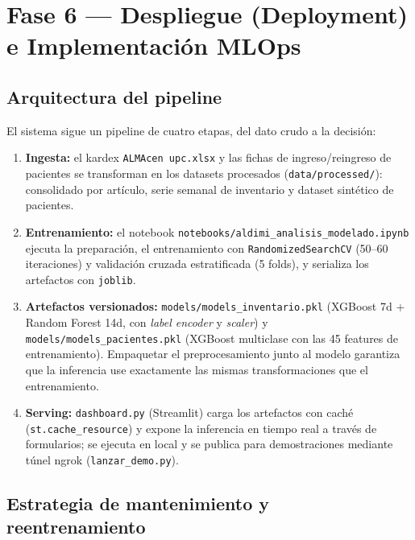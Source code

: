 \section{Fase 6 --- Despliegue (Deployment) e Implementación MLOps}

\subsection{Arquitectura del pipeline}

El sistema sigue un pipeline de cuatro etapas, del dato crudo a la decisión:

\begin{enumerate}[leftmargin=1.8em]
  \item \textbf{Ingesta:} el kardex \texttt{ALMAcen upc.xlsx} y las fichas
        de ingreso/reingreso de pacientes se transforman en los datasets
        procesados (\texttt{data/processed/}): consolidado por artículo,
        serie semanal de inventario y dataset sintético de pacientes.
  \item \textbf{Entrenamiento:} el notebook
        \texttt{notebooks/aldimi\_analisis\_modelado.ipynb} ejecuta la
        preparación, el entrenamiento con \texttt{RandomizedSearchCV}
        (50--60 iteraciones) y validación cruzada estratificada (5 folds),
        y serializa los artefactos con \texttt{joblib}.
  \item \textbf{Artefactos versionados:} \texttt{models/models\_inventario.pkl}
        (XGBoost 7d + Random Forest 14d, con \emph{label encoder} y
        \emph{scaler}) y \texttt{models/models\_pacientes.pkl} (XGBoost
        multiclase con las 45 features de entrenamiento). Empaquetar el
        preprocesamiento junto al modelo garantiza que la inferencia use
        exactamente las mismas transformaciones que el entrenamiento.
  \item \textbf{Serving:} \texttt{dashboard.py} (Streamlit) carga los
        artefactos con caché (\texttt{st.cache\_resource}) y expone la
        inferencia en tiempo real a través de formularios; se ejecuta en
        local y se publica para demostraciones mediante t\'unel ngrok
        (\texttt{lanzar\_demo.py}).
\end{enumerate}

\subsection{Estrategia de mantenimiento y reentrenamiento}


